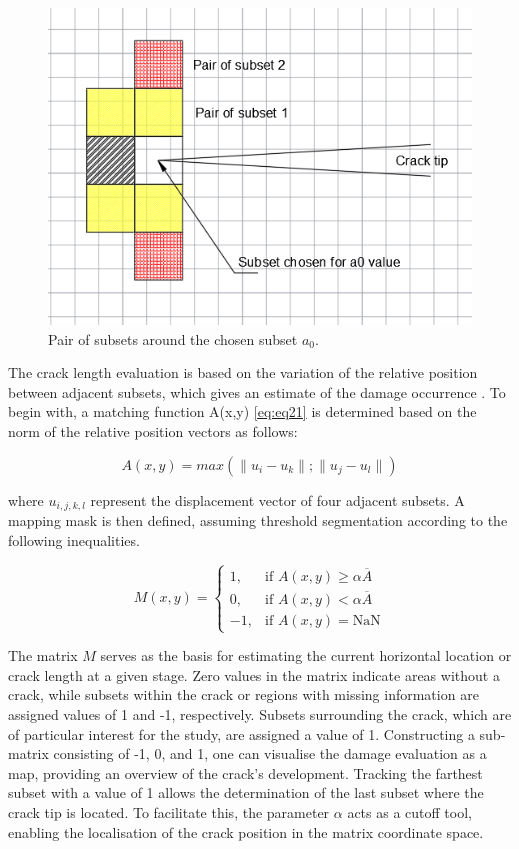 \documentclass[3p,times,procedia]{elsarticle}
\begin{document}
\begin{figure}[htp]
	\centering
	\includegraphics[scale=0.5]{Figures/fig29bis}
	\caption{Pair of subsets around the chosen subset $a_0$.}
	\label{fig:fig29bis}
\end{figure}

The crack length evaluation is based on the variation of the relative position between adjacent subsets, which gives an estimate of the damage occurrence \citep{Xavieretal2014}. To begin with, a matching function A(x,y) \ref{eq:eq21} is determined based on the norm of the relative position vectors as follows:

\begin{equation}
	A(x,y)=max(\lVert u_i-u_k\rVert;\lVert u_j-u_l\rVert)
	\label{eq:eq21}
\end{equation}

where $u_{i,j,k,l}$ represent the displacement vector of four adjacent subsets. A mapping mask is then defined, assuming threshold segmentation according to the following inequalities.

\begin{equation}
	M(x,y)=
	\begin{cases}
		1, & \text{if } A(x, y) \geq \alpha \overline{A} \\
		0, & \text{if } A(x, y) < \alpha \overline{A} \\
		-1, & \text{if } A(x, y) = \textrm{NaN}
	\end{cases}
	\label{eq:eq22}
\end{equation}

The matrix $M$ serves as the basis for estimating the current horizontal location or crack length at a given stage. Zero values in the matrix indicate areas without a crack, while subsets within the crack or regions with missing information are assigned values of 1 and -1, respectively. Subsets surrounding the crack, which are of particular interest for the study, are assigned a value of 1. Constructing a sub-matrix consisting of -1, 0, and 1, one can visualise the damage evaluation as a map, providing an overview of the crack's development. Tracking the farthest subset with a value of 1 allows the determination of the last subset where the crack tip is located. To facilitate this, the parameter $\alpha$ acts as a cutoff tool, enabling the localisation of the crack position in the matrix coordinate space.
\end{document}
